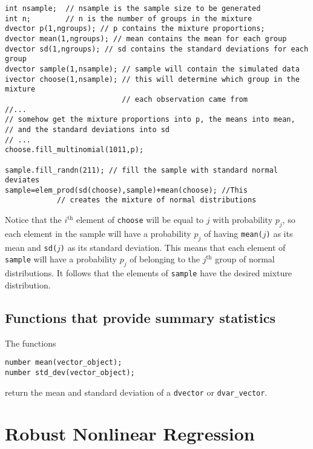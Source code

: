 \documentclass{admbmanual}
\begin{document}
\begin{lstlisting}
int nsample;  // nsample is the sample size to be generated
int n;        // n is the number of groups in the mixture
dvector p(1,ngroups); // p contains the mixture proportions;
dvector mean(1,ngroups); // mean contains the mean for each group
dvector sd(1,ngroups); // sd contains the standard deviations for each group
dvector sample(1,nsample); // sample will contain the simulated data
ivector choose(1,nsample); // this will determine which group in the mixture
                           // each observation came from
//...
// somehow get the mixture proportions into p, the means into mean,
// and the standard deviations into sd
// ...
choose.fill_multinomial(1011,p);

sample.fill_randn(211); // fill the sample with standard normal deviates
sample=elem_prod(sd(choose),sample)+mean(choose); //This
            // creates the mixture of normal distributions
\end{lstlisting}

Notice that the $i^\textrm{th}$ element of \texttt{choose} will be equal to $j$
with probability $p_j$, so each element in the sample will have a probability
$p_j$ of having \texttt{mean($j$)} as its mean and \texttt{sd($j$)} as its
standard deviation. This means that each element of \texttt{sample} will have a
probability $p_j$ of belonging to the $j^\textrm{th}$ group of normal
distributions. It follows that the elements of \texttt{sample} have the desired
mixture distribution.

\section{Functions that provide summary statistics}

The functions
\begin{lstlisting}
number mean(vector_object);
number std_dev(vector_object);
\end{lstlisting}
\noindent return the mean and standard deviation of a \texttt{dvector} or
\texttt{dvar\_vector}.


\chapter{Robust Nonlinear Regression}
\label{ch:robust-nonlinear-regression}
\end{document}
